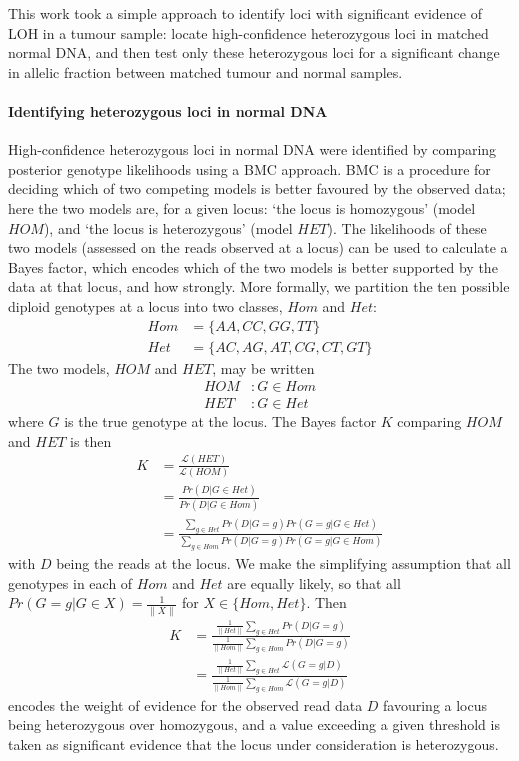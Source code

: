 \documentclass[thesis.tex]{subfiles}
\begin{document}
This work took a simple approach to identify loci with significant evidence of \gls{LOH} in a tumour sample: locate high-confidence heterozygous loci in matched normal DNA, and then test only these heterozygous loci for a significant change in allelic fraction between matched tumour and normal samples.

\paragraph{Identifying heterozygous loci in normal DNA}

High-confidence heterozygous loci in normal DNA were identified by comparing posterior genotype likelihoods using a \gls{BMC} approach.  \gls{BMC} is a procedure for deciding which of two competing models is better favoured by the observed data; here the two models are, for a given locus: `the locus is homozygous' (model $HOM$), and `the locus is heterozygous' (model $HET$).  The likelihoods of these two models (assessed on the reads observed at a locus) can be used to calculate a Bayes factor, which encodes which of the two models is better supported by the data at that locus, and how strongly.  More formally, we partition the ten possible diploid genotypes at a locus into two classes, $Hom$ and $Het$:
\begin{align}
Hom &= \{AA, CC, GG, TT\} \\
Het &= \{AC, AG, AT, CG, CT, GT\}
\end{align}
The two models, $HOM$ and $HET$, may be written
\begin{align}
HOM &: G \in Hom \\
HET &: G \in Het
\end{align}
where $G$ is the true genotype at the locus.  The Bayes factor $K$ comparing $HOM$ and $HET$ is then
\begin{align}
K &= \frac{\mathcal{L}(HET)}{\mathcal{L}(HOM)} \\
  &= \frac{Pr(D|G \in Het)}{Pr(D|G \in Hom)} \\
  &= \frac{\sum_{g \in Het} Pr(D|G = g)Pr(G = g|G \in Het) }{\sum_{g \in Hom} Pr(D|G = g)Pr(G = g|G \in Hom) }
\label{eq:comm_het_bayes}
\end{align}
with $D$ being the reads at the locus.  We make the simplifying assumption that all genotypes in each of $Hom$ and $Het$ are equally likely, so that all $Pr(G = g|G \in X) = \frac{1}{\|X\|}$ for $X \in \{Hom, Het\}$.  Then
\begin{align}
K &= \frac{\frac{1}{\|Het\|}\sum_{g \in Het} Pr(D|G = g)}{\frac{1}{\|Hom\|}\sum_{g \in Hom} Pr(D|G = g)} \\
  &= \frac{\frac{1}{\|Het\|}\sum_{g \in Het} \mathcal{L}(G = g|D)}{\frac{1}{\|Hom\|}\sum_{g \in Hom} \mathcal{L}(G = g|D)}
\end{align} 
encodes the weight of evidence for the observed read data $D$ favouring a locus being heterozygous over homozygous, and a value exceeding a given threshold is taken as significant evidence that the locus under consideration is heterozygous.
\end{document}
